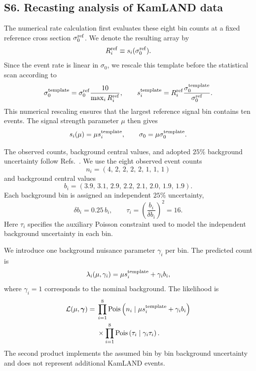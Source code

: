 \documentclass[aps,twocolumn,superscriptaddress,groupedaddress,nofootinbib,floatfix]{revtex4}
\begin{document}
\subsection*{S6. Recasting analysis of KamLAND data}
The numerical rate calculation first evaluates these
eight bin counts at a fixed reference cross section
$\sigma_0^{\rm ref}$.  We denote the resulting array by
\begin{equation}
R_i^{\rm ref}
\equiv
s_i(\sigma_0^{\rm ref}).
\end{equation}
Since the event rate is linear in $\sigma_0$, we rescale this template
before the statistical scan according to
\begin{equation}
\sigma_0^{\rm template}
=
\sigma_0^{\rm ref}
\frac{10}{\max_i R_i^{\rm ref}},
\qquad
s_i^{\rm template}
=
R_i^{\rm ref}
\frac{\sigma_0^{\rm template}}{\sigma_0^{\rm ref}}.
\label{eq:kamland-template}
\end{equation}
This numerical rescaling ensures that the largest reference signal bin
contains ten events.  The signal strength parameter $\mu$ then gives
\begin{equation}
s_i(\mu)=\mu s_i^{\rm template},
\qquad
\sigma_0=\mu\sigma_0^{\rm template}.
\label{eq:kamland-mu-sigma}
\end{equation}

The observed counts, background central values, and adopted $25\%$
background uncertainty follow
Refs.~\cite{Gong:2025ves,MeighenBerger:2023tad}. We use the eight observed event counts
\begin{equation}
n_i=(4,\,2,\,2,\,2,\,2,\,1,\,1,\,1)
\end{equation}
and background central values
\begin{equation}
b_i=(3.9,\,3.1,\,2.9,\,2.2,\,2.1,\,2.0,\,1.9,\,1.9).
\label{eq:kamland-backgrounds}
\end{equation}
Each background bin is assigned an independent $25\%$ uncertainty,
\begin{equation}
\delta b_i=0.25\,b_i,
\qquad
\tau_i=
\left(\frac{b_i}{\delta b_i}\right)^2=16.
\label{eq:kamland-background-uncertainty}
\end{equation}
Here $\tau_i$ specifies the auxiliary Poisson constraint used to model
the independent background uncertainty in each bin.

We introduce one background nuisance parameter $\gamma_i$ per bin.  The
predicted count is
\begin{equation}
\lambda_i(\mu,\gamma_i)
=
\mu s_i^{\rm template}+\gamma_i b_i,
\end{equation}
where $\gamma_i=1$ corresponds to the nominal background.  The
likelihood is
\begin{align}
\mathcal L(\mu,\boldsymbol{\gamma})
={}&
\prod_{i=1}^{8}
\operatorname{Pois}
\left(
n_i\mid
\mu s_i^{\rm template}+\gamma_i b_i
\right)
\nonumber\\
&\times
\prod_{i=1}^{8}
\operatorname{Pois}
\left(
\tau_i\mid
\gamma_i\tau_i
\right).
\label{eq:kamland-likelihood}
\end{align}
The second product implements the assumed bin by bin background
uncertainty and does not represent additional KamLAND events.
\end{document}
